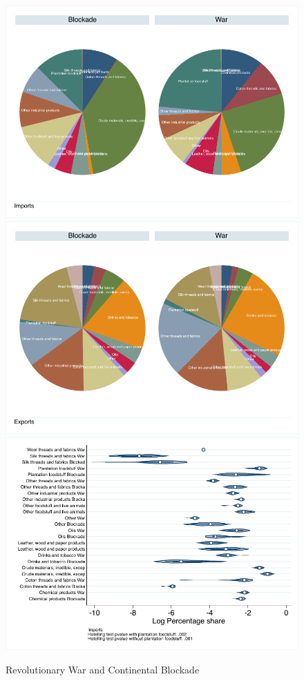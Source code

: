 \documentclass[12pt,a4paper,notitlepage,english]{article}
\begin{document}
\begin{figure}
\centering
\caption{Revolutionary War and Continental Blockade}
\label{napoleonic_blockade}
\includegraphics[scale=.63]{revolutionary_block_composition_I}
\includegraphics[scale=.63]{revolutionary_block_composition_X}
\vspace{0.7cm}
\includegraphics[scale=.63]{revolutionary_block_distribution_I}

\end{figure}
\end{document}
